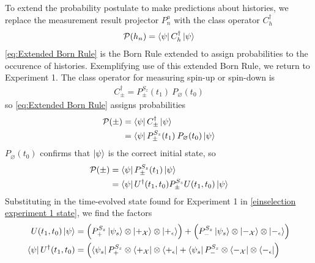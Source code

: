 To extend the probability postulate to make predictions about histories, we replace the measurement result projector $P^a_n$ with the class operator $C_h^\dagger$
\begin{align} \label{eq:Extended Born Rule}
  \mathcal{P}(h_n) = \bra{\psi} C_h^\dagger \ket{\psi}
\end{align}
\autoref{eq:Extended Born Rule} is the Born Rule extended to assign probabilities to the occurence of histories. Exemplifying use of this extended Born Rule, we return to Experiment 1. The class operator for measuring spin-up or spin-down is
\begin{align}
  C_\pm^\dagger = P^{S_z}_\pm (t_1) \: P_\varnothing (t_0)
\end{align}
so \autoref{eq:Extended Born Rule} assigns probabilities
\begin{align}
  \mathcal{P}(\pm) &= \bra{\psi} C_\pm^\dagger \ket{\psi} \\ \nonumber
  &= \bra{\psi} P^{S_z}_\pm (t_1) \: P_\varnothing (t_0) \ket{\psi}
\end{align}
$P_\varnothing (t_0)$ confirms that $\ket{\psi}$ is the correct initial state, so
\begin{align}
  \mathcal{P}(\pm) &= \bra{\psi} P^{S_z}_\pm (t_1) \ket{\psi} \\ \nonumber
  &= \bra{\psi} U^\dagger(t_1, t_0) P^{S_z}_\pm U(t_1, t_0) \ket{\psi}
\end{align}
Substituting in the time-evolved state found for Experiment 1 in \autoref{einselection experiment 1 state}, we find the factors
\begin{align}
  U(t_1, t_0) \ket{\psi} &= \left(P^{S_z}_+ \ket{\psi_s} \otimes \ket{+_\mathcal{X}} \otimes \ket{+_\epsilon}\right) + \left(P^{S_z}_- \ket{\psi_s} \otimes \ket{-_\mathcal{X}} \otimes \ket{-_\epsilon} \right)\\ \nonumber
  \bra{\psi} U^\dagger(t_1, t_0) &= \left(\bra{\psi_s}P^{S_z}_+ \otimes \bra{+_\mathcal{X}} \otimes \bra{+_\epsilon} + \bra{\psi_s}P^{S_z}_- \otimes \bra{-_\mathcal{X}} \otimes \bra{-_\epsilon}\right)
\end{align}
